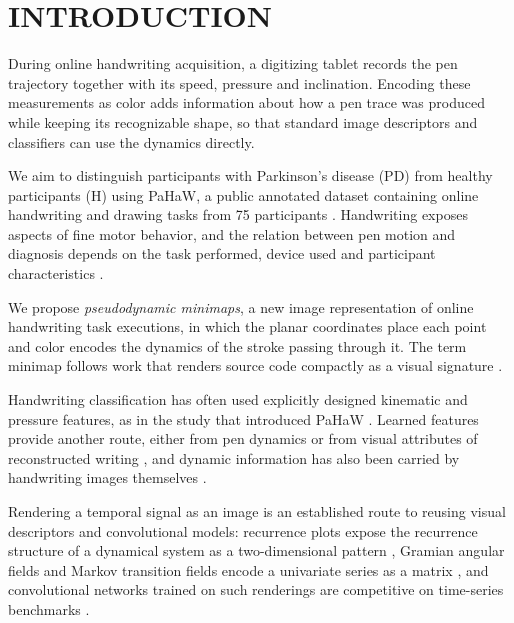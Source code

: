 \section{\uppercase{Introduction}}
\label{sec:introduction}
\noindent
During online handwriting acquisition, a digitizing tablet records the pen trajectory together with its speed, pressure and inclination. Encoding these measurements as color adds information about how a pen trace was produced while keeping its recognizable shape, so that standard image descriptors and classifiers can use the dynamics directly.

We aim to distinguish participants with Parkinson's disease (PD) from healthy participants (H) using PaHaW, a public annotated dataset containing online handwriting and drawing tasks from 75 participants \cite{Drotar2016}. Handwriting exposes aspects of fine motor behavior, and the relation between pen motion and diagnosis depends on the task performed, device used and participant characteristics \cite{Impedovo2019}.

We propose \emph{pseudodynamic minimaps}, a new image representation of online handwriting task executions, in which the planar coordinates place each point and color encodes the dynamics of the stroke passing through it. The term minimap follows work that renders source code compactly as a visual signature \cite{Gebara2025}.

Handwriting classification has often used explicitly designed kinematic and pressure features, as in the study that introduced PaHaW \cite{Drotar2016}. Learned features provide another route, either from pen dynamics \cite{Pereira2016} or from visual attributes of reconstructed writing \cite{Moetesum2019}, and dynamic information has also been carried by handwriting images themselves \cite{Diaz2019,Cilia2021SyntheticImages}.

Rendering a temporal signal as an image is an established route to reusing visual descriptors and convolutional models: recurrence plots expose the recurrence structure of a dynamical system as a two-dimensional pattern \cite{Eckmann1987}, Gramian angular fields and Markov transition fields encode a univariate series as a matrix \cite{Wang2015}, and convolutional networks trained on such renderings are competitive on time-series benchmarks \cite{Hatami2018}.

